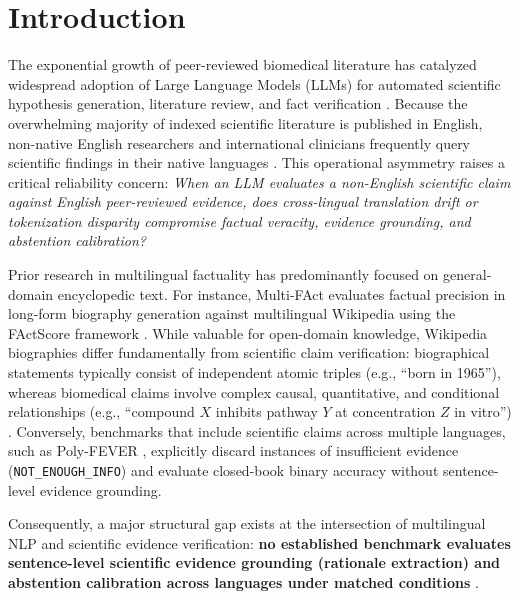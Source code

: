 \documentclass[10pt,twocolumn]{article}
\begin{document}
\section{Introduction}
\label{sec:intro}

The exponential growth of peer-reviewed biomedical literature has catalyzed widespread adoption of Large Language Models (LLMs) for automated scientific hypothesis generation, literature review, and fact verification \cite{wadden2020fact,kumar2026benchmarking}. Because the overwhelming majority of indexed scientific literature is published in English, non-native English researchers and international clinicians frequently query scientific findings in their native languages \cite{nllb2022team,shafayat2024multifact}. This operational asymmetry raises a critical reliability concern: \textit{When an LLM evaluates a non-English scientific claim against English peer-reviewed evidence, does cross-lingual translation drift or tokenization disparity compromise factual veracity, evidence grounding, and abstention calibration?}

Prior research in multilingual factuality has predominantly focused on general-domain encyclopedic text. For instance, Multi-FAct \cite{shafayat2024multifact} evaluates factual precision in long-form biography generation against multilingual Wikipedia using the FActScore framework \cite{min2023factscore}. While valuable for open-domain knowledge, Wikipedia biographies differ fundamentally from scientific claim verification: biographical statements typically consist of independent atomic triples (e.g., ``born in 1965''), whereas biomedical claims involve complex causal, quantitative, and conditional relationships (e.g., ``compound $X$ inhibits pathway $Y$ at concentration $Z$ in vitro'') \cite{wadden2020fact}. Conversely, benchmarks that include scientific claims across multiple languages, such as Poly-FEVER \cite{zhang2024polyfever}, explicitly discard instances of insufficient evidence (\texttt{NOT\_ENOUGH\_INFO}) and evaluate closed-book binary accuracy without sentence-level evidence grounding.

Consequently, a major structural gap exists at the intersection of multilingual NLP and scientific evidence verification: \textbf{no established benchmark evaluates sentence-level scientific evidence grounding (rationale extraction) and abstention calibration across languages under matched conditions} \cite{kumar2026benchmarking}.
\end{document}
